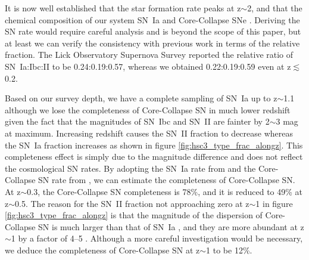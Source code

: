 \documentclass[proof]{pasj01}
\providecommand{\DIFadd}[1]{{\protect\color{blue} \sf #1}} %
\providecommand{\DIFdel}[1]{{\protect\color{red} \scriptsize #1}} %
\providecommand{\DIFaddbegin}{\protect\color{blue}} %
\providecommand{\DIFaddend}{\protect\color{black}} %
\providecommand{\DIFdelbegin}{\protect\color{red}} %
\providecommand{\DIFdelend}{\protect\color{black}} %
\newcommand{\DIFscaledelfig}{0.5}
\newlength{\DIFdelgraphicswidth} %
\newlength{\DIFdelgraphicsheight} %
\newcommand{\DIFaddincludegraphics}[2][]{{\color{blue}\fbox{\DIFOincludegraphics[#1]{#2}}}} %
\newcommand{\DIFdelincludegraphics}[2][]{%
\sbox{\DIFdelgraphicsbox}{\DIFOincludegraphics[#1]{#2}}%
\settoboxwidth{\DIFdelgraphicswidth}{\DIFdelgraphicsbox} %
\settoboxtotalheight{\DIFdelgraphicsheight}{\DIFdelgraphicsbox} %
\scalebox{\DIFscaledelfig}{%
\parbox[b]{\DIFdelgraphicswidth}{\usebox{\DIFdelgraphicsbox}\\[-\baselineskip] \rule{\DIFdelgraphicswidth}{0em}}\llap{\resizebox{\DIFdelgraphicswidth}{\DIFdelgraphicsheight}{%
\setlength{\unitlength}{\DIFdelgraphicswidth}%
\begin{picture}(1,1)%
\thicklines\linethickness{2pt} %
{\color[rgb]{1,0,0}\put(0,0){\framebox(1,1){}}}%
{\color[rgb]{1,0,0}\put(0,0){\line( 1,1){1}}}%
{\color[rgb]{1,0,0}\put(0,1){\line(1,-1){1}}}%
\end{picture}%
}\hspace*{3pt}}} %
} %
\DeclareRobustCommand{\DIFaddbegin}{\DIFOaddbegin \let\includegraphics\DIFaddincludegraphics} %
\DeclareRobustCommand{\DIFaddend}{\DIFOaddend \let\includegraphics\DIFOincludegraphics} %
\DeclareRobustCommand{\DIFdelbegin}{\DIFOdelbegin \let\includegraphics\DIFdelincludegraphics} %
\DeclareRobustCommand{\DIFdelend}{\DIFOaddend \let\includegraphics\DIFOincludegraphics} %
\begin{document}
It is now well established that the star formation rate peaks at z$\sim$2, and that the chemical composition of our system \DIFdelbegin \DIFdel{is a mixture of }\DIFdelend \DIFaddbegin \DIFadd{results from both }\DIFaddend SN~Ia and Core-Collapse SNe \citep{tsujimoto95a,kobayashi11a}.
Deriving the SN rate would require careful analysis \citep{dilday08a,brown19a,frohmaier19a} and is beyond the scope of this paper, but at least we can verify the consistency with previous work in terms of the relative fraction.
The Lick Observatory Supernova Survey \citep{li11a} reported the relative ratio of SN~Ia:Ibc:II to be 0.24:0.19:0.57, whereas we obtained 0.22:0.19:0.59 even at z$\lesssim$0.2. 

Based on our survey depth, we have a complete sampling of SN~Ia up to z$\sim$1.1 although we lose the completeness of Core-Collapse SN in much lower redshift given the fact that the magnitudes of SN~Ibc and SN~II are fainter by 2$\sim$3 mag at maximum.
Increasing redshift causes the SN~II fraction to decrease whereas the SN~Ia fraction increases as shown in figure \ref{fig:hsc3_type_frac_alongz}. 
This completeness effect is simply due to the magnitude difference and does not reflect the cosmological SN rates.
By adopting the SN~Ia rate from \citet{graur14a} and the Core-Collapse SN rate from \citet{strolger15a}, we can estimate the completeness of Core-Collapse SN. 
At z$\sim$0.3, the Core-Collapse SN completeness is 78\%, and it is reduced to 49\% at z$\sim$0.5. 
The reason for the SN~II fraction not approaching zero at z$\sim$1 in figure \ref{fig:hsc3_type_frac_alongz} is that the magnitude of the dispersion of Core-Collapse SN \citep[$\sigma$ $\sim$ 1.2 mag]{li11a,kessler19b} is much larger than that of SN~Ia \citep[$\sigma$ $\sim$ 0.5 mag]{rubin15a}, and they are more abundant at z$\sim$1 by a factor of 4--5 \citep{madau98a,hounsell18a}. 
Although a more careful investigation would be necessary, we deduce the completeness of Core-Collapse SN at z$\sim$1 to be 12\%.

%
%
%
\end{document}
